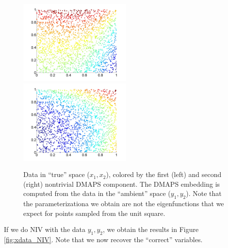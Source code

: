 \documentclass[12pt]{article}
\begin{document}
\begin{figure}[htb]
\includegraphics[width=0.5\textwidth]{xdata_colored_DMAPS1}
\includegraphics[width=0.5\textwidth]{xdata_colored_DMAPS2}
\caption{Data in ``true'' space ($x_1, x_2$), colored by the first (left) and second (right) nontrivial DMAPS component. The DMAPS embedding is computed from the data in the ``ambient'' space ($y_1, y_2$). Note that the parameterizationa we obtain are not the eigenfunctions that we expect for points sampled from the unit square.}
\label{fig:xdata_dmaps}
\end{figure}

If we do NIV with the data $y_1, y_2$, 
we obtain the results in Figure \ref{fig:xdata_NIV}.
%
Note that we now recover the ``correct'' variables.
\end{document}
